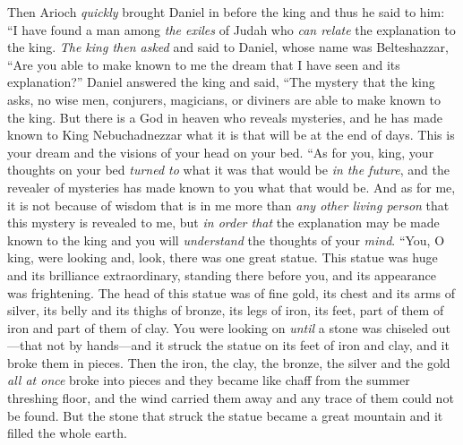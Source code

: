 \begin{biblechapter}
\verse Then Arioch \textit{quickly} brought Daniel in before the king and thus he said to him: “I have found a man among \textit{the exiles} of Judah who \textit{can relate} the explanation to the king.
\verse \textit{The king then asked} and said to Daniel, whose name was Belteshazzar, “Are you able to make known to me the dream that I have seen and its explanation?”
\verse Daniel answered the king and said, “The mystery that the king asks, no wise men, conjurers, magicians, or diviners are able to make known to the king.
\verse But there is a God in heaven who reveals mysteries, and he has made known to King Nebuchadnezzar what it is that will be at the end of days. This is your dream and the visions of your head on your bed.
\verse “As for you, king, your thoughts on your bed \textit{turned to} what it was that would be \textit{in the future}, and the revealer of mysteries has made known to you what that would be.
\verse And as for me, it is not because of wisdom that is in me more than \textit{any other living person} that this mystery is revealed to me, but \textit{in order that} the explanation may be made known to the king and you will \textit{understand} the thoughts of your \textit{mind}.
\verse “You, O king, were looking and, look, there was one great statue. This statue was huge and its brilliance extraordinary, standing there before you, and its appearance was frightening.
\verse The head of this statue was of fine gold, its chest and its arms of silver, its belly and its thighs of bronze,
\verse its legs of iron, its feet, part of them of iron and part of them of clay.
\verse You were looking on \textit{until} a stone was chiseled out—that not by hands—and it struck the statue on its feet of iron and clay, and it broke them in pieces.
\verse Then the iron, the clay, the bronze, the silver and the gold \textit{all at once} broke into pieces and they became like chaff from the summer threshing floor, and the wind carried them away and any trace of them could not be found. But the stone that struck the statue became a great mountain and it filled the whole earth.

\end{biblechapter}
